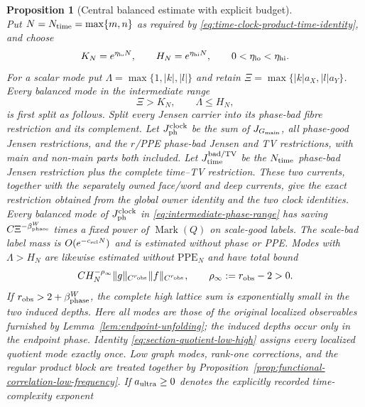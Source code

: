 \documentclass[11pt]{article}
\newtheorem{proposition}[theorem]{Proposition}
\begin{document}
\begin{proposition}[Central balanced estimate with explicit budget]
\begin{equation}
\end{equation}
Put $N=N_{\rm time}=\max\{m,n\}$ as required by
\eqref{eq:time-clock-product-time-identity}, and choose
\begin{equation}
\label{eq:three-frequency-cutoffs}
 K_N=e^{\eta_{\rm lo}N},\qquad
 H_N=e^{\eta_{\rm hi}N},\qquad
 0<\eta_{\rm lo}<\eta_{\rm hi}.
\end{equation}
For a scalar mode put
$\Lambda=\max\{1,|k|,|l|\}$ and retain
$\Xi=\max\{|k|a_X,|l|a_Y\}$.  Every balanced mode in the intermediate range
\begin{equation}
\label{eq:intermediate-phase-range}
 \Xi>K_N,\qquad \Lambda\le H_N,
\end{equation}
is first split as follows.  Split every Jensen carrier into its phase-bad
fibre restriction and its complement.  Let $J_{\rm ph}^{\rm clock}$ be the
sum of $J_{G_{\rm main}}$, all phase-good Jensen restrictions, and the
$r$/PPE phase-bad Jensen and TV restrictions, with main and non-main parts
both included.  Let $J_{\rm time}^{\rm bad/TV}$ be the $N_{\rm time}$
phase-bad Jensen restriction plus the complete time--TV restriction.  These
two currents, together with the separately owned face/word and deep
currents, give the exact restriction obtained from the global owner identity
and the two clock identities.  Every
balanced mode of $J_{\rm ph}^{\rm clock}$ in
\eqref{eq:intermediate-phase-range} has saving
\(C\Xi^{-\beta_{\rm phase}^{W}}\) times a fixed power of
\(\operatorname{Mark}(Q)\) on scale-good labels.  The scale-bad label mass is
$O(e^{-c_{\rm scl}N})$ and is estimated without phase or PPE.  Modes with
$\Lambda>H_N$ are likewise estimated without
$\mathrm{PPE}_{N}$ and have total bound
\begin{equation}
\label{eq:ultra-high-observable-tail}
 C H_N^{-\rho_\infty}\|g\|_{C^{r_{\rm obs}}}
 \|f\|_{C^{r_{\rm obs}}},\qquad
 \rho_\infty:=r_{\rm obs}-2>0.
\end{equation}
If $r_{\rm obs}>2+\beta_{\rm phase}^{W}$, the complete high lattice sum is
exponentially small in the two induced depths.  Here all modes are those of the original
localized observables furnished by Lemma~\ref{lem:endpoint-unfolding}; the
induced depths occur only in the endpoint phase.  Identity
\eqref{eq:section-quotient-low-high} assigns every localized quotient mode
exactly once.  Low graph modes, rank-one corrections, and
the regular product block are treated together by
Proposition~\ref{prop:functional-correlation-low-frequency}.  If
$a_{\rm ultra}\ge0$ denotes the explicitly recorded time-complexity exponent

\end{proposition}
\end{document}
